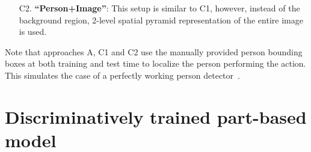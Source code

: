 \documentclass{bmvc2k}
\newcommand{\secnspc}{\vspace*{-2mm}}
\begin{document}
\begin{enumerate}
\item[C2.] {\bf ``Person+Image''}: This setup is similar to C1, however, instead of the background region, 2-level spatial pyramid representation of the entire image is used.  

\end{enumerate}

Note that approaches A, C1 and C2 use the manually provided person bounding boxes at both training and test time
to localize the person performing the action.  
This simulates the case of a perfectly working person detector~\cite{Dalal05,Felzenszwalb09}.




\secnspc
\section{Discriminatively trained part-based model}
\secnspc
\label{sec:lsvm}
\end{document}
